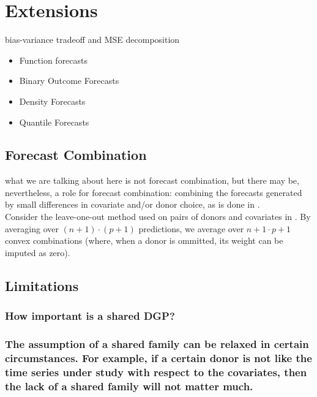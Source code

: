 \documentclass[11pt]{article}
\theoremstyle{definition}
\begin{document}
\section{Extensions}\label{Extensions}
bias-variance tradeoff and MSE decomposition\\

\begin{itemize}
  \item Function forecasts
  \item Binary Outcome Forecasts
  \item Density Forecasts
  \item Quantile Forecasts
\end{itemize}

\subsection{Forecast Combination}
what we are talking about here is not forecast combination, but there may be, nevertheless, a role for forecast combination: combining the forecasts generated by small differences in covariate and/or donor choice, as is done in \cite{lundquist2024volatility}. \\

Consider the leave-one-out method used on pairs of donors and covariates in \cite{lundquist2024volatility}.  By averaging over $(n+1)\cdot (p+1)$ predictions, we average over $n+1 \cdot p + 1$ convex combinations (where, when a donor is ommitted, its weight can be imputed as zero).

\subsection{Limitations}\label{Limitations}

\subsubsection{How important is a shared DGP?}

\subsubsection{The assumption of a shared family can be relaxed in certain circumstances.  For example, if a certain donor is not like the time series under study with respect to the covariates, then the lack of a shared family will not matter much.}




\clearpage



 
\end{document}
